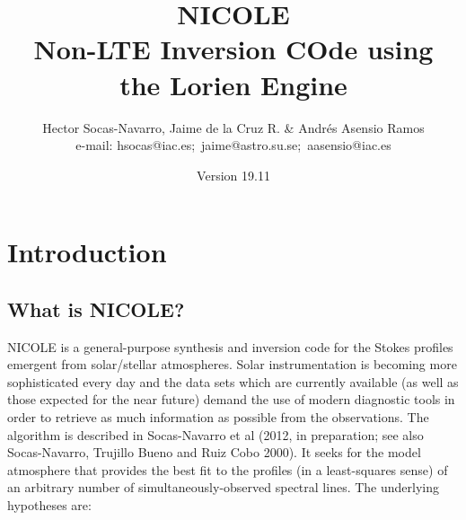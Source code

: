 

\title{NICOLE \\
Non-LTE Inversion COde using \\
the Lorien Engine}

\author{Hector Socas-Navarro,
    Jaime de la Cruz R. \& Andr\'es Asensio Ramos \\
%
e-mail: \mbox{hsocas@iac.es; jaime@astro.su.se; aasensio@iac.es}\\
}

\date{Version 19.11}

\maketitle


\tableofcontents



\chapter{Introduction}
\section{What is NICOLE?}

NICOLE is a general-purpose synthesis and inversion code for the
Stokes profiles emergent from solar/stellar atmospheres.  Solar
instrumentation is becoming more sophisticated every day and the data
sets which are currently available (as well as those expected for the
near future) demand the use of modern diagnostic tools in order to
retrieve as much information as possible from the observations.  The
algorithm is described in Socas-Navarro et al (2012, in preparation;
see also Socas-Navarro, Trujillo Bueno and Ruiz Cobo 2000). It seeks
for the model atmosphere that provides the best fit to the profiles
(in a least-squares sense) of an arbitrary number of
simultaneously-observed spectral lines.  The underlying hypotheses
are:

